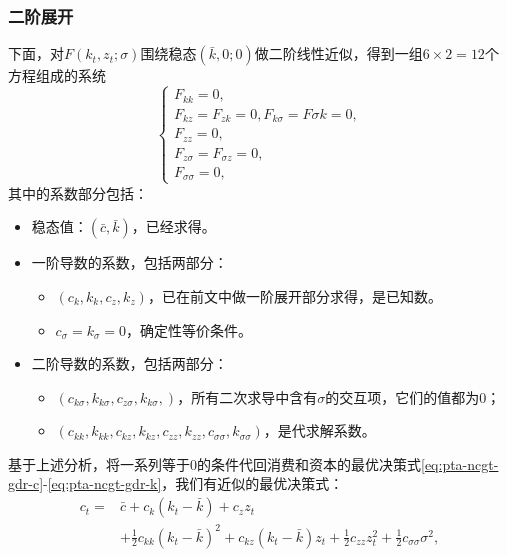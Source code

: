 \subsubsection{二阶展开}
下面，对$F(k_t,z_t;\sigma)$围绕稳态$(\bar{k},0;0)$做二阶线性近似，得到一组$6 \times 2=12$个方程组成的系统
\begin{equation}
  \begin{cases}
    F_{kk}=0, \\
    F_{kz}=F_{zk}=0,
    F_{k\sigma}=F{\sigma k} =0,\\
    F_{zz} = 0,\\
    F_{z\sigma}=F_{\sigma z}=0,\\
    F_{\sigma \sigma}=0,
  \end{cases}
\end{equation}
其中的系数部分包括：
\begin{itemize}
  \item 稳态值：$(\bar{c}, \bar{k})$，已经求得。
  \item 一阶导数的系数，包括两部分：
  \begin{itemize}
    \item $\left( c_k,k_k,c_z,k_z \right)$，已在前文中做一阶展开部分求得，是已知数。
    \item $c_{\sigma} = k_{\sigma} = 0$，确定性等价条件。
  \end{itemize}
  \item 二阶导数的系数，包括两部分：
  \begin{itemize}
    \item $\left(c_{k \sigma}, k_{k \sigma}, c_{z \sigma}, k_{k \sigma}, \right)$，所有二次求导中含有$\sigma$的交互项，它们的值都为$0$；
    \item $\left( c_{k k}, k_{k k}, c_{k z}, k_{k z}, c_{z z}, k_{z z}, c_{\sigma \sigma}, k_{\sigma \sigma} \right)$，是代求解系数。
  \end{itemize}
\end{itemize}

基于上述分析，将一系列等于$0$的条件代回消费和资本的最优决策式\eqref{eq:pta-ncgt-gdr-c}-\eqref{eq:pta-ncgt-gdr-k}，我们有近似的最优决策式：
\begin{equation}
  \label{eq:pta-ncgt-gdr-c-approx}
\begin{split}
    c_t =& \bar{c} + c_k \left( k_t - \bar{k} \right) + c_z z_t \\
    &+\frac{1}{2} c_{kk} \left( k_t - \bar{k} \right)^2 + c_{kz} \left( k_t - \bar{k} \right) z_t + \frac{1}{2} c_{zz} z_t^2 + \frac{1}{2} c_{\sigma \sigma} \sigma^2,
\end{split}
\end{equation}

